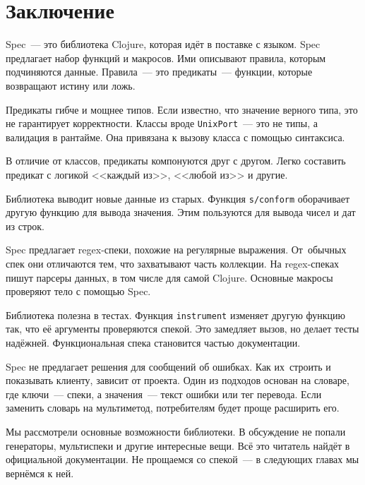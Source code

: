 \section{Заключение}

Spec~--- это библиотека Clojure, которая идёт в поставке с языком. Spec предлагает
набор функций и макросов. Ими описывают правила, которым подчиняются
данные. Правила~--- это предикаты~--- функции, которые возвращают истину или ложь.

Предикаты гибче и мощнее типов. Если известно, что значение верного типа, это не
гарантирует корректности. Классы вроде \verb|UnixPort|~--- это не типы, а
валидация в рантайме. Она привязана к вызову класса с помощью синтаксиса.

В отличие от классов, предикаты компонуются друг с другом. Легко составить
предикат с логикой <<каждый из>>, <<любой из>> и другие.

Библиотека выводит новые данные из старых. Функция \verb|s/conform|
оборачивает другую функцию для вывода значения. Этим пользуются для вывода чисел
и дат из строк.

Spec предлагает regex-спеки, похожие на регулярные выражения. От~обычных спек
они отличаются тем, что захватывают часть коллекции. На regex-спеках пишут
парсеры данных, в том числе для самой Clojure. Основные макросы проверяют тело с
помощью Spec.

Библиотека полезна в тестах. Функция \verb|instrument| изменяет другую функцию
так, что её аргументы проверяются спекой. Это замедляет вызов, но делает тесты
надёжней. Функциональная спека становится частью документации.

Spec не предлагает решения для сообщений об ошибках. Как их~строить и показывать
клиенту, зависит от проекта. Один из подходов основан на словаре, где ключи~---
спеки, а значения~--- текст ошибки или тег перевода. Если заменить словарь на
мультиметод, потребителям будет проще расширить его.

Мы рассмотрели основные возможности библиотеки. В обсуждение не попали
генераторы, мультиспеки и другие интересные вещи. Всё это читатель найдёт в
официальной документации. Не прощаемся со спекой~--- в следующих главах мы
вернёмся к ней.
